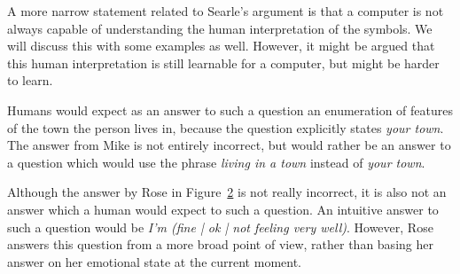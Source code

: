 A more narrow statement related to Searle's argument is that a computer is not always capable of understanding the human interpretation of the symbols. We will discuss this with some examples as well. However, it might be argued that this human interpretation is still learnable for a computer, but might be harder to learn.

\begin{figure}[ht]
   \begin{center}
   \end{center}
   \caption{}
   \label{Example3}
\end{figure}

Humans would expect as an answer to such a question an enumeration of features of the town the person lives in, because the question explicitly states \textit{your town}. The answer from Mike is not entirely incorrect, but would rather be an answer to a question which would use the phrase \textit{living in a town} instead of \textit{your town}.

\begin{figure}[ht]
   \begin{center}
   \end{center}
   \caption{}
   \label{Example4}
\end{figure}

Although the answer by Rose in Figure~\ref{Example4} is not really incorrect, it is also not an answer which a human would expect to such a question. An intuitive answer to such a question would be \textit{I'm (fine | ok | not feeling very well)}. However, Rose answers this question from a more broad point of view, rather than basing her answer on her emotional state at the current moment.

